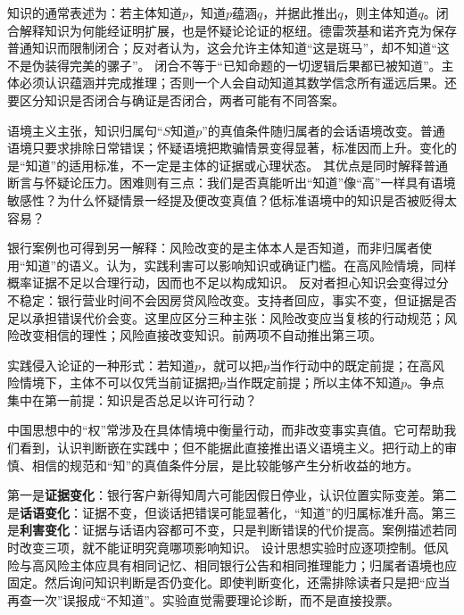 知识的通常表述为：若主体知道$p$，知道$p$蕴涵$q$，并据此推出$q$，则主体知道$q$。闭合解释知识为何能经证明扩展，也是怀疑论论证的枢纽。德雷茨基和诺齐克为保存普通知识而限制闭合\parencite{dretske1970,nozick1981}；反对者认为，这会允许主体知道“这是斑马”，却不知道“这不是伪装得完美的骡子”。 闭合不等于“已知命题的一切逻辑后果都已被知道”。主体必须认识蕴涵并完成推理；否则一个人会自动知道其数学信念所有遥远后果。还要区分知识是否闭合与确证是否闭合，两者可能有不同答案。

语境主义主张，知识归属句“$S$知道$p$”的真值条件随归属者的会话语境改变\parencite{derose1992,lewis1996}。普通语境只要求排除日常错误；怀疑语境把欺骗情景变得显著，标准因而上升。变化的是“知道”的适用标准，不一定是主体的证据或心理状态。 其优点是同时解释普通断言与怀疑论压力。困难则有三点：我们是否真能听出“知道”像“高”一样具有语境敏感性？为什么怀疑情景一经提及便改变真值？低标准语境中的知识是否被贬得太容易？

银行案例也可得到另一解释：风险改变的是主体本人是否知道，而非归属者使用“知道”的语义。认为，实践利害可以影响知识或确证门槛\parencite{stanley2005,hawthorne2004}。在高风险情境，同样概率证据不足以合理行动，因而也不足以构成知识。 反对者担心知识会变得过分不稳定：银行营业时间不会因房贷风险改变。支持者回应，事实不变，但证据是否足以承担错误代价会变。这里应区分三种主张：风险改变应当复核的行动规范；风险改变相信的理性；风险直接改变知识。前两项不自动推出第三项。

\begin{argumentbox}
实践侵入论证的一种形式：若知道$p$，就可以把$p$当作行动中的既定前提；在高风险情境下，主体不可以仅凭当前证据把$p$当作既定前提；所以主体不知道$p$。争点集中在第一前提：知识是否总足以许可行动？
\end{argumentbox}

\begin{comparison}
中国思想中的“权”常涉及在具体情境中衡量行动，而非改变事实真值。它可帮助我们看到，认识判断嵌在实践中；但不能据此直接推出语义语境主义。把行动上的审慎、相信的规范和“知”的真值条件分层，是比较能够产生分析收益的地方。
\end{comparison}

第一是\textbf{证据变化}：银行客户新得知周六可能因假日停业，认识位置实际变差。第二是\textbf{话语变化}：证据不变，但谈话把错误可能显著化，“知道”的归属标准升高。第三是\textbf{利害变化}：证据与话语内容都可不变，只是判断错误的代价提高。案例描述若同时改变三项，就不能证明究竟哪项影响知识。 设计思想实验时应逐项控制。低风险与高风险主体应具有相同记忆、相同银行公告和相同推理能力；归属者语境也应固定。然后询问知识判断是否仍变化。即使判断变化，还需排除读者只是把“应当再查一次”误报成“不知道”。实验直觉需要理论诊断，而不是直接投票。

